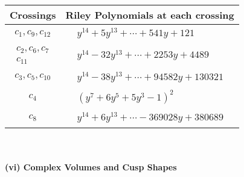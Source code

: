 \documentclass[1p]{elsarticle_modified}
\theoremstyle{definition}
\begin{document}
\begin{tabular}{m{50pt}|m{274pt}}
Crossings & \hspace{64pt}Riley Polynomials at each crossing \\
\hline $$\begin{aligned}c_{1},c_{9},c_{12}\end{aligned}$$&$\begin{aligned}
&y^{14}+5 y^{13}+\cdots+541 y+121
\end{aligned}$\\
\hline $$\begin{aligned}c_{2},c_{6},c_{7}\\c_{11}\end{aligned}$$&$\begin{aligned}
&y^{14}-32 y^{13}+\cdots+2253 y+4489
\end{aligned}$\\
\hline $$\begin{aligned}c_{3},c_{5},c_{10}\end{aligned}$$&$\begin{aligned}
&y^{14}-38 y^{13}+\cdots+94582 y+130321
\end{aligned}$\\
\hline $$\begin{aligned}c_{4}\end{aligned}$$&$\begin{aligned}
&(y^7+6 y^5+5 y^3-1)^2
\end{aligned}$\\
\hline $$\begin{aligned}c_{8}\end{aligned}$$&$\begin{aligned}
&y^{14}+6 y^{13}+\cdots-369028 y+380689
\end{aligned}$\\
\hline
\end{tabular}\\~\\
\newpage\flushleft \textbf{(vi) Complex Volumes and Cusp Shapes}
\end{document}
